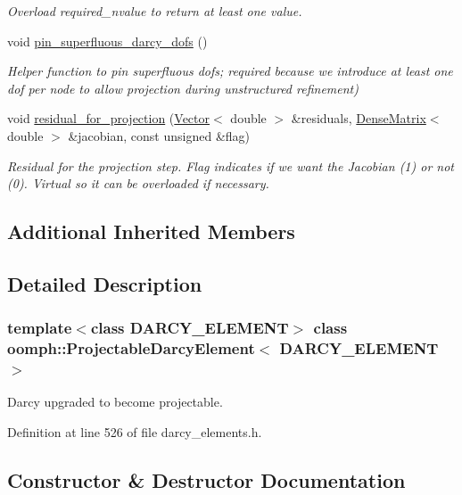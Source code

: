 \begin{DoxyCompactItemize}
\begin{DoxyCompactList}\small\item\em Overload required\+\_\+nvalue to return at least one value. \end{DoxyCompactList}\item 
void \hyperlink{classoomph_1_1ProjectableDarcyElement_a9ef8e257420ab1ef09862ca1cedd25c0}{pin\+\_\+superfluous\+\_\+darcy\+\_\+dofs} ()
\begin{DoxyCompactList}\small\item\em Helper function to pin superfluous dofs; required because we introduce at least one dof per node to allow projection during unstructured refinement) \end{DoxyCompactList}\item 
void \hyperlink{classoomph_1_1ProjectableDarcyElement_abfbe95045be80a5aacaa0f3a714468fe}{residual\+\_\+for\+\_\+projection} (\hyperlink{classoomph_1_1Vector}{Vector}$<$ double $>$ \&residuals, \hyperlink{classoomph_1_1DenseMatrix}{Dense\+Matrix}$<$ double $>$ \&jacobian, const unsigned \&flag)
\begin{DoxyCompactList}\small\item\em Residual for the projection step. Flag indicates if we want the Jacobian (1) or not (0). Virtual so it can be overloaded if necessary. \end{DoxyCompactList}\end{DoxyCompactItemize}
\subsection*{Additional Inherited Members}


\subsection{Detailed Description}
\subsubsection*{template$<$class D\+A\+R\+C\+Y\+\_\+\+E\+L\+E\+M\+E\+NT$>$\newline
class oomph\+::\+Projectable\+Darcy\+Element$<$ D\+A\+R\+C\+Y\+\_\+\+E\+L\+E\+M\+E\+N\+T $>$}

Darcy upgraded to become projectable. 

Definition at line 526 of file darcy\+\_\+elements.\+h.



\subsection{Constructor \& Destructor Documentation}
\mbox{\label{classoomph_1_1ProjectableDarcyElement_ad32ffacb463b234cc17956c1eb45f222}} 
